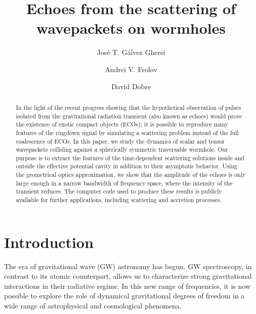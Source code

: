 \documentclass[article,aps,nofootinbib,twocolumn,superscriptaddress]{revtex4-1}
\begin{document}
\title{Echoes from the scattering of wavepackets on wormholes}

\author{Jos\'e T. G\'alvez Ghersi}
\author{Andrei V. Frolov}
\author{David Dobre}


\begin{abstract}
In the light of the recent progress showing that the hypothetical observation of pulses isolated from the gravitational radiation transient (also known as echoes) would prove the existence of exotic compact objects (ECOs); it is possible to reproduce many features of the ringdown signal by simulating a scattering problem instead of the full coalescence of ECOs. In this paper, we study the dynamics of scalar and tensor wavepackets colliding against a spherically symmetric traversable wormhole. Our purpose is to extract the features of the time-dependent scattering solutions inside and outside the effective potential cavity in addition to their asymptotic behavior. Using the geometrical optics approximation, we show that the amplitude of the echoes is only large enough in a narrow bandwidth of frequency space, where the intensity of the transient reduces. The computer code used to produce these results is publicly available for further applications, including scattering and accretion processes.      
\end{abstract}

\maketitle


\section{Introduction}
The era of gravitational wave (GW) astronomy \citep{Abbott:2016blz, Abbott:2016nmj} has begun. GW spectroscopy, in contrast to its atomic counterpart, allows us to characterize strong gravitational interactions in their radiative regime. In this new range of frequencies, it is now possible to explore the role of dynamical gravitational degrees of freedom in a wide range of astrophysical \citep{Frolov:2017asg, Cardoso:2016rao} and cosmological \citep{Krauss989, Ade:2018gkx} phenomena. 
\end{document}
